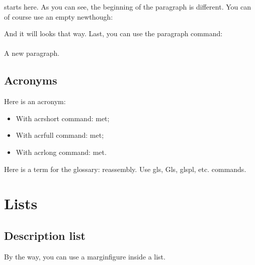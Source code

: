  starts here. As you can see, the beginning of the paragraph is different. You can of course use an empty newthough:

\newthought{} And it will looks that way. Last, you can use the paragraph command:

\paragraph{} A new paragraph.

\subsection{Acronyms}

Here is an acronym:
\begin{itemize}
    \item With acrshort command: \acrshort{met};
    \item With acrfull command: \acrfull{met};
    \item With acrlong command: \acrlong{met}.
\end{itemize}

Here is a term for the glossary: \Gls{reassembly}. Use gls, Gls, glspl, etc. commands.


\section{Lists}
\label{sec:task:list}

\subsection{Description list}

By the way, you can use a marginfigure inside a list.

